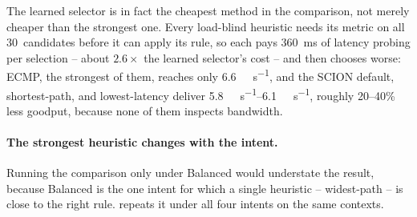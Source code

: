 The learned selector is in fact the cheapest method in the comparison, not merely cheaper than the
strongest one. Every load-blind heuristic needs its metric on all 30~candidates before it can apply its
rule, so each pays \SI{360}{\milli\second} of latency probing per selection -- about $2.6\times$ the
learned selector's cost -- and then chooses worse: ECMP, the strongest of them, reaches only
\SI{6.6}{\giga\bit\per\second}, and the SCION default, shortest-path, and lowest-latency deliver
\SIrange{5.8}{6.1}{\giga\bit\per\second}, roughly 20--40\% less goodput, because none of them inspects
bandwidth.

\paragraph{The strongest heuristic changes with the intent.} Running the comparison only under Balanced
would understate the result, because Balanced is the one intent for which a single heuristic --
widest-path -- is close to the right rule.  repeats it under all four intents on
the same contexts.

